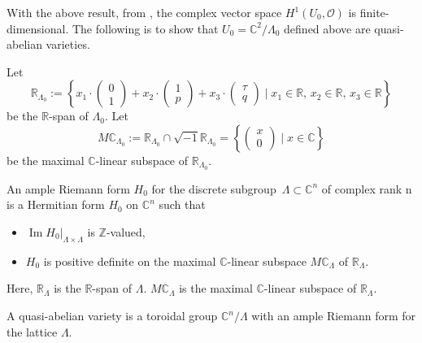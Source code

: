 \documentclass[pdftex]{sigma}
\numberwithin{equation}{section}
\begin{document}
With the above result, from \cite{Christian}, the complex vector space $H^1(U_0,\mathcal{O})$ is finite-dimensional. The following is to show that $U_0=\mathbb{C}^2/\Lambda_0$ defined above are quasi-abelian varieties.

Let
\[\mathbb{R}_{\Lambda_{0}}:=\left \{ x_1 \cdot \begin{pmatrix}0 \\1\end{pmatrix}+x_2 \cdot \begin{pmatrix}1 \\p\end{pmatrix} +x_3 \cdot \begin{pmatrix}\tau \\q\end{pmatrix}\mid x_1\in \mathbb{R},\,x_2\in \mathbb{R},\,x_3\in \mathbb{R}\right \}\]
be the $\mathbb{R}$-span of $\Lambda_0$. Let
\[M\mathbb{C}_{\Lambda_0}:=\mathbb{R}_{\Lambda_0}\cap\sqrt{-1}\mathbb{R}_{\Lambda_0}=\left \{ \begin{pmatrix}x \\0\end{pmatrix}\mid x\in \mathbb{C}\right \}\]
be the maximal $\mathbb{C}$-linear subspace of $\mathbb{R}_{\Lambda_{0}}$.

\begin{Definition}\label{Definition2.15}
 An ample Riemann form $H_0$ for the discrete subgroup~${\Lambda \subset \mathbb{C}^n}$ of complex rank n is a Hermitian form $H_0$ on $\mathbb{C}^n$ such that
\begin{itemize}\itemsep=0pt
\item[$(1)$]$\operatorname{ Im}H_0|_{\Lambda\times\Lambda}$ is $\mathbb{Z}$-valued,
\item[$(2)$]$H_0$ is positive definite on the maximal $\mathbb{C}$-linear subspace $M\mathbb{C}_\Lambda$ of $\mathbb{R}_\Lambda$.
\end{itemize}
Here, $\mathbb{R}_\Lambda$ is the $\mathbb{R}$-span of $\Lambda$. $M\mathbb{C}_\Lambda$ is the maximal $\mathbb{C}$-linear subspace of $\mathbb{R}_\Lambda$.
\end{Definition}

\begin{Definition}\label{Definition2.16}
 A quasi-abelian variety is a toroidal group $\mathbb{C}^n/\Lambda$ with an ample Riemann form for the lattice $\Lambda$.
\end{Definition}
\end{document}
